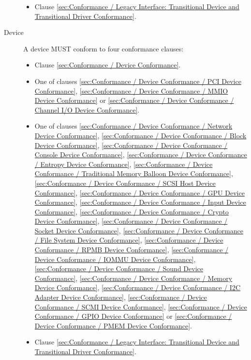 \begin{description}
\begin{itemize}
    \item Clause \ref{sec:Conformance / Legacy Interface: Transitional Device and Transitional Driver Conformance}.
  \end{itemize}
\item[Device] A device MUST conform to four conformance clauses:
  \begin{itemize}
    \item Clause \ref{sec:Conformance / Device Conformance}.
    \item One of clauses \ref{sec:Conformance / Device Conformance / PCI Device Conformance}, \ref{sec:Conformance / Device Conformance / MMIO Device Conformance} or \ref{sec:Conformance / Device Conformance / Channel I/O Device Conformance}.
    \item One of clauses 
\ref{sec:Conformance / Device Conformance / Network Device Conformance}, 
\ref{sec:Conformance / Device Conformance / Block Device Conformance}, 
\ref{sec:Conformance / Device Conformance / Console Device Conformance}, 
\ref{sec:Conformance / Device Conformance / Entropy Device Conformance}, 
\ref{sec:Conformance / Device Conformance / Traditional Memory Balloon Device Conformance}, 
\ref{sec:Conformance / Device Conformance / SCSI Host Device Conformance}, 
\ref{sec:Conformance / Device Conformance / GPU Device Conformance},
\ref{sec:Conformance / Device Conformance / Input Device Conformance}, 
\ref{sec:Conformance / Device Conformance / Crypto Device Conformance}, 
\ref{sec:Conformance / Device Conformance / Socket Device Conformance}, 
\ref{sec:Conformance / Device Conformance / File System Device Conformance},
\ref{sec:Conformance / Device Conformance / RPMB Device Conformance},
\ref{sec:Conformance / Device Conformance / IOMMU Device Conformance},
\ref{sec:Conformance / Device Conformance / Sound Device Conformance},
\ref{sec:Conformance / Device Conformance / Memory Device Conformance},
\ref{sec:Conformance / Device Conformance / I2C Adapter Device Conformance},
\ref{sec:Conformance / Device Conformance / SCMI Device Conformance},
\ref{sec:Conformance / Device Conformance / GPIO Device Conformance} or
\ref{sec:Conformance / Device Conformance / PMEM Device Conformance}.

    \item Clause \ref{sec:Conformance / Legacy Interface: Transitional Device and Transitional Driver Conformance}.
  \end{itemize}
\end{description}

\label{sec:Conformance / Driver Conformance}

